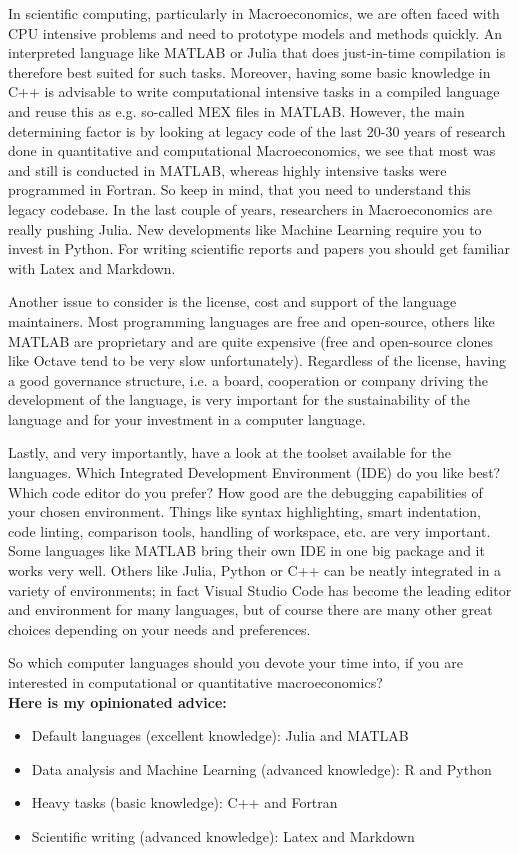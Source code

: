 \begin{enumerate}
	In scientific computing, particularly in Macroeconomics,
	  we are often faced with CPU intensive problems 
	  and need to prototype models and methods quickly.
	An interpreted language like MATLAB or Julia that does just-in-time compilation
	  is therefore best suited for such tasks.
	Moreover, having some basic knowledge in C++ is advisable
	  to write computational intensive tasks in a compiled language 
	  and reuse this as e.g. so-called MEX files in MATLAB.
	However, the main determining factor is by looking at legacy code of the last 20-30 years of research done
	  in quantitative and computational Macroeconomics,
	  we see that most was and still is conducted in MATLAB,
	  whereas highly intensive tasks were programmed in Fortran.
	So keep in mind, that you need to understand this legacy codebase.
	In the last couple of years, researchers in Macroeconomics are really pushing Julia.
	New developments like Machine Learning require you to invest in Python.
	For writing scientific reports and papers you should get familiar with Latex and Markdown.
	
	Another issue to consider is the license, cost and support of the language maintainers.
	Most programming languages are free and open-source,
	  others like MATLAB are proprietary and are quite expensive
	  (free and open-source clones like Octave tend to be very slow unfortunately).
	Regardless of the license, having a good governance structure,
	  i.e. a board, cooperation or company driving the development of the language,
	  is very important for the sustainability of the language
	  and for your investment in a computer language.
			
	Lastly, and very importantly, have a look at the toolset available for the languages.
	Which Integrated Development Environment (IDE) do you like best?
	Which code editor do you prefer?
	How good are the debugging capabilities of your chosen environment.
	Things like syntax highlighting, smart indentation, code linting, comparison tools,
	  handling of workspace, etc. are very important.
	Some languages like MATLAB bring their own IDE in one big package and it works very well.
	Others like Julia, Python or C++ can be neatly integrated in a variety of environments;
	  in fact Visual Studio Code has become the leading editor and environment for many languages,
	  but of course there are many other great choices depending on your needs and preferences.
	
	So which computer languages should you devote your time into,
	  if you are interested in computational or quantitative macroeconomics?
	\\
	\textbf{Here is my opinionated advice:}
	\begin{itemize}
		\item Default languages (excellent knowledge): Julia and MATLAB
		\item Data analysis and Machine Learning (advanced knowledge): R and Python
		\item Heavy tasks (basic knowledge): C++ and Fortran
		\item Scientific writing (advanced knowledge): Latex and Markdown
	\end{itemize}
\end{enumerate}